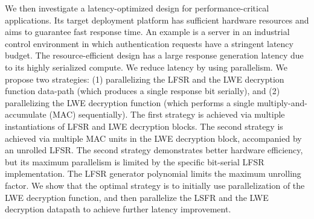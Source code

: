 We then investigate a latency-optimized design for performance-critical applications. Its target deployment platform has sufficient hardware resources and aims to guarantee fast response time. An example is a server in an industrial control environment in which authentication requests have a stringent latency budget. The resource-efficient design has a large response generation latency due to its highly serialized compute. We reduce latency by using parallelism. %
We propose two strategies: (1) parallelizing the LFSR and the LWE decryption function data-path (which produces a single response bit serially), and (2) parallelizing the LWE decryption function (which performs a single multiply-and-accumulate (MAC) sequentially). The first strategy is achieved via multiple instantiations of LFSR and LWE decryption blocks. The second strategy is achieved via multiple MAC units in the LWE decryption block, accompanied by an unrolled LFSR. %
The second strategy demonstrates better hardware efficiency, but its maximum parallelism is limited by the specific bit-serial LFSR implementation. The LFSR generator polynomial limits the maximum unrolling factor. We show that the optimal strategy is to initially use parallelization of the LWE decryption function, and then parallelize the LSFR and the LWE decryption datapath to achieve further latency improvement.

